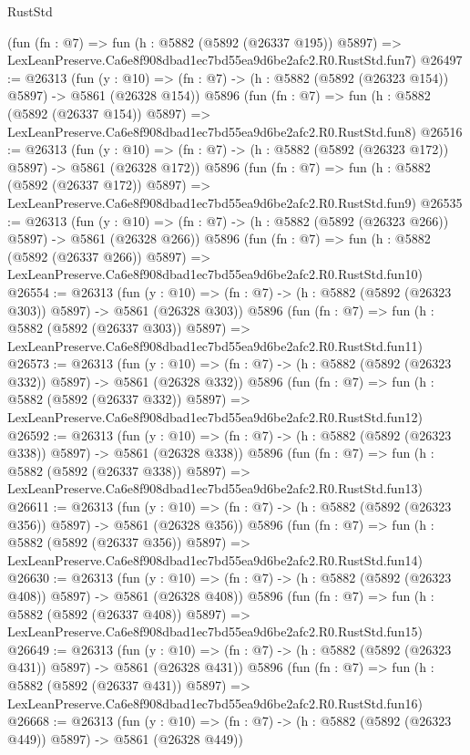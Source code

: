 \begin{lexlean}{RustStd}
\begin{coremodule}
    (fun (fn : @7) =>
    fun (h : @5882 (@5892 (@26337 @195)) @5897) =>
    LexLeanPreserve.Ca6e8f908dbad1ec7bd55ea9d6be2afc2.R0.RustStd.fun7)
@26497 := @26313
    (fun (y : @10) => (fn : @7) -> (h : @5882 (@5892 (@26323 @154)) @5897) -> @5861 (@26328 @154))
    @5896
    (fun (fn : @7) =>
    fun (h : @5882 (@5892 (@26337 @154)) @5897) =>
    LexLeanPreserve.Ca6e8f908dbad1ec7bd55ea9d6be2afc2.R0.RustStd.fun8)
@26516 := @26313
    (fun (y : @10) => (fn : @7) -> (h : @5882 (@5892 (@26323 @172)) @5897) -> @5861 (@26328 @172))
    @5896
    (fun (fn : @7) =>
    fun (h : @5882 (@5892 (@26337 @172)) @5897) =>
    LexLeanPreserve.Ca6e8f908dbad1ec7bd55ea9d6be2afc2.R0.RustStd.fun9)
@26535 := @26313
    (fun (y : @10) => (fn : @7) -> (h : @5882 (@5892 (@26323 @266)) @5897) -> @5861 (@26328 @266))
    @5896
    (fun (fn : @7) =>
    fun (h : @5882 (@5892 (@26337 @266)) @5897) =>
    LexLeanPreserve.Ca6e8f908dbad1ec7bd55ea9d6be2afc2.R0.RustStd.fun10)
@26554 := @26313
    (fun (y : @10) => (fn : @7) -> (h : @5882 (@5892 (@26323 @303)) @5897) -> @5861 (@26328 @303))
    @5896
    (fun (fn : @7) =>
    fun (h : @5882 (@5892 (@26337 @303)) @5897) =>
    LexLeanPreserve.Ca6e8f908dbad1ec7bd55ea9d6be2afc2.R0.RustStd.fun11)
@26573 := @26313
    (fun (y : @10) => (fn : @7) -> (h : @5882 (@5892 (@26323 @332)) @5897) -> @5861 (@26328 @332))
    @5896
    (fun (fn : @7) =>
    fun (h : @5882 (@5892 (@26337 @332)) @5897) =>
    LexLeanPreserve.Ca6e8f908dbad1ec7bd55ea9d6be2afc2.R0.RustStd.fun12)
@26592 := @26313
    (fun (y : @10) => (fn : @7) -> (h : @5882 (@5892 (@26323 @338)) @5897) -> @5861 (@26328 @338))
    @5896
    (fun (fn : @7) =>
    fun (h : @5882 (@5892 (@26337 @338)) @5897) =>
    LexLeanPreserve.Ca6e8f908dbad1ec7bd55ea9d6be2afc2.R0.RustStd.fun13)
@26611 := @26313
    (fun (y : @10) => (fn : @7) -> (h : @5882 (@5892 (@26323 @356)) @5897) -> @5861 (@26328 @356))
    @5896
    (fun (fn : @7) =>
    fun (h : @5882 (@5892 (@26337 @356)) @5897) =>
    LexLeanPreserve.Ca6e8f908dbad1ec7bd55ea9d6be2afc2.R0.RustStd.fun14)
@26630 := @26313
    (fun (y : @10) => (fn : @7) -> (h : @5882 (@5892 (@26323 @408)) @5897) -> @5861 (@26328 @408))
    @5896
    (fun (fn : @7) =>
    fun (h : @5882 (@5892 (@26337 @408)) @5897) =>
    LexLeanPreserve.Ca6e8f908dbad1ec7bd55ea9d6be2afc2.R0.RustStd.fun15)
@26649 := @26313
    (fun (y : @10) => (fn : @7) -> (h : @5882 (@5892 (@26323 @431)) @5897) -> @5861 (@26328 @431))
    @5896
    (fun (fn : @7) =>
    fun (h : @5882 (@5892 (@26337 @431)) @5897) =>
    LexLeanPreserve.Ca6e8f908dbad1ec7bd55ea9d6be2afc2.R0.RustStd.fun16)
@26668 := @26313
    (fun (y : @10) => (fn : @7) -> (h : @5882 (@5892 (@26323 @449)) @5897) -> @5861 (@26328 @449))

\end{coremodule}
\end{lexlean}
